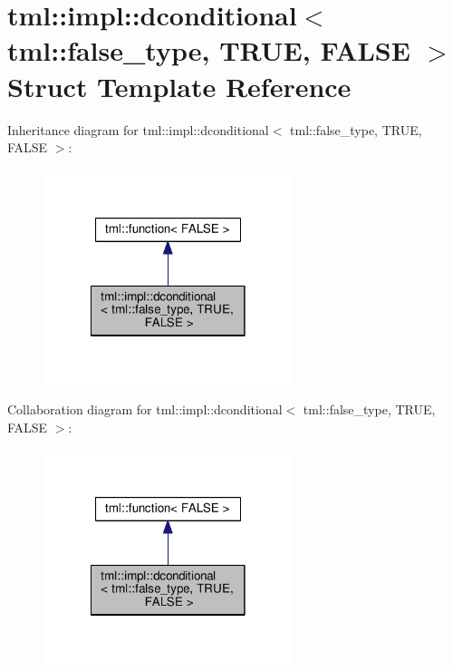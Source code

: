 \hypertarget{structtml_1_1impl_1_1dconditional_3_01tml_1_1false__type_00_01_t_r_u_e_00_01_f_a_l_s_e_01_4}{\section{tml\+:\+:impl\+:\+:dconditional$<$ tml\+:\+:false\+\_\+type, T\+R\+U\+E, F\+A\+L\+S\+E $>$ Struct Template Reference}
\label{structtml_1_1impl_1_1dconditional_3_01tml_1_1false__type_00_01_t_r_u_e_00_01_f_a_l_s_e_01_4}
}


Inheritance diagram for tml\+:\+:impl\+:\+:dconditional$<$ tml\+:\+:false\+\_\+type, T\+R\+U\+E, F\+A\+L\+S\+E $>$\+:
\nopagebreak
\begin{figure}[H]
\begin{center}
\leavevmode
\includegraphics[width=206pt]{structtml_1_1impl_1_1dconditional_3_01tml_1_1false__type_00_01_t_r_u_e_00_01_f_a_l_s_e_01_4__inherit__graph}
\end{center}
\end{figure}


Collaboration diagram for tml\+:\+:impl\+:\+:dconditional$<$ tml\+:\+:false\+\_\+type, T\+R\+U\+E, F\+A\+L\+S\+E $>$\+:
\nopagebreak
\begin{figure}[H]
\begin{center}
\leavevmode
\includegraphics[width=206pt]{structtml_1_1impl_1_1dconditional_3_01tml_1_1false__type_00_01_t_r_u_e_00_01_f_a_l_s_e_01_4__coll__graph}
\end{center}
\end{figure}
